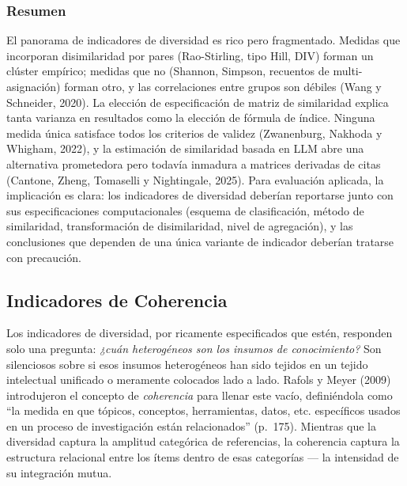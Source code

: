 \documentclass[
]{article}
\begin{document}
\hypertarget{resumen}{%
\subsubsection{Resumen}\label{resumen}}

El panorama de indicadores de diversidad es rico pero fragmentado.
Medidas que incorporan disimilaridad por pares (Rao-Stirling, tipo Hill,
DIV) forman un clúster empírico; medidas que no (Shannon, Simpson,
recuentos de multi-asignación) forman otro, y las correlaciones entre
grupos son débiles (Wang y Schneider, 2020). La elección de
especificación de matriz de similaridad explica tanta varianza en
resultados como la elección de fórmula de índice. Ninguna medida única
satisface todos los criterios de validez (Zwanenburg, Nakhoda y Whigham,
2022), y la estimación de similaridad basada en LLM abre una alternativa
prometedora pero todavía inmadura a matrices derivadas de citas
(Cantone, Zheng, Tomaselli y Nightingale, 2025). Para evaluación
aplicada, la implicación es clara: los indicadores de diversidad
deberían reportarse junto con sus especificaciones computacionales
(esquema de clasificación, método de similaridad, transformación de
disimilaridad, nivel de agregación), y las conclusiones que dependen de
una única variante de indicador deberían tratarse con precaución.

\hypertarget{indicadores-de-coherencia}{%
\subsection{Indicadores de Coherencia}\label{indicadores-de-coherencia}}

Los indicadores de diversidad, por ricamente especificados que estén,
responden solo una pregunta: \emph{¿cuán heterogéneos son los insumos de
conocimiento?} Son silenciosos sobre si esos insumos heterogéneos han
sido tejidos en un tejido intelectual unificado o meramente colocados
lado a lado. Rafols y Meyer (2009) introdujeron el concepto de
\emph{coherencia} para llenar este vacío, definiéndola como ``la medida
en que tópicos, conceptos, herramientas, datos, etc. específicos usados
en un proceso de investigación están relacionados'' (p.~175). Mientras
que la diversidad captura la amplitud categórica de referencias, la
coherencia captura la estructura relacional entre los ítems dentro de
esas categorías --- la intensidad de su integración mutua.
\end{document}
